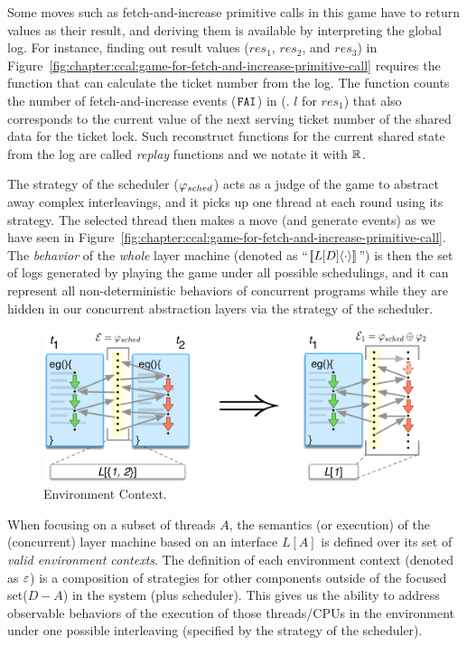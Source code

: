 Some moves such as fetch-and-increase primitive calls in this game have to return values as their result,
and deriving them is available by interpreting the global log. 
For instance, finding out result values ($res_1$, $res_2$, and $res_3$) in Figure~\ref{fig:chapter:ccal:game-for-fetch-and-increase-primitive-call}
requires the function that can calculate the ticket number from the log.
The function counts the number of fetch-and-increase events (${\mathrm{\texttt{FAI}}}$) in (\eg. $l$ for $res_1$) that
also corresponds to the current value of the next serving ticket number of the shared data for the ticket lock.
Such reconstruct functions for the current shared state from the log are called \emph{replay} functions and we notate it with $\mathbb{R}$.

The strategy of the scheduler ($\varphi_{sched}$) acts as a judge of the game to abstract away complex interleavings, 
and it picks up one thread at each round using its strategy. 
The selected thread then makes a move  (and generate events)  as we have seen in Figure~\ref{fig:chapter:ccal:game-for-fetch-and-increase-primitive-call}.
The \emph{behavior} of the \emph{whole} layer machine (denoted as ``$[\![{L[D]} \langle {\cdot} \rangle]\!]$'') 
is then the set of  logs generated by playing the game under all possible schedulings, and it can represent all non-deterministic behaviors of concurrent programs 
while they are hidden in our concurrent abstraction layers via the strategy of the scheduler.

\begin{figure}[t]
\centering
\includegraphics[scale=0.6]{figs/ccal/pcomp}
\caption{Environment Context.}
\label{fig:chapter:ccal:env-contexs}
\end{figure}

When focusing on a subset of threads $A$, the semantics (or execution) of the (concurrent) layer machine based on an
interface $L[A]$ is defined over its set of \emph{valid environment
contexts}. 
The definition of each  environment context (denoted as ${\varepsilon}$) is
a composition  of strategies for other components outside of the focused set($D - A$) in the 
system (plus scheduler).
This gives us the ability to address observable behaviors of the
execution of those threads/CPUs in the environment under one possible
interleaving (specified by the strategy of the scheduler).

